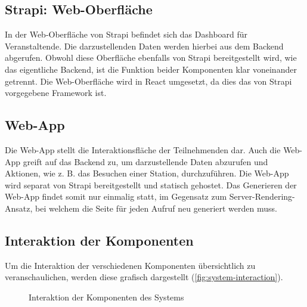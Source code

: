 \subsection{Strapi: Web-Oberfläche}

In der Web-Oberfläche von Strapi befindet sich das Dashboard für Veranstaltende.
Die darzustellenden Daten werden hierbei aus dem Backend abgerufen. Obwohl diese
Oberfläche ebenfalls von Strapi bereitgestellt wird, wie das eigentliche
Backend, ist die Funktion beider Komponenten klar voneinander getrennt. Die
Web-Oberfläche wird in React umgesetzt, da dies das von Strapi vorgegebene
Framework ist.

\subsection{Web-App}

Die Web-App stellt die Interaktionsfläche der Teilnehmenden dar. Auch die
Web-App greift auf das Backend zu, um darzustellende Daten abzurufen und
Aktionen, wie z. B. das Besuchen einer Station, durchzuführen. Die Web-App wird
separat von Strapi bereitgestellt und statisch gehostet. Das Generieren der
Web-App findet somit nur einmalig statt, im Gegensatz zum
Server-Rendering-Ansatz, bei welchem die Seite für jeden Aufruf neu generiert
werden muss.

\subsection{Interaktion der Komponenten}

Um die Interaktion der verschiedenen Komponenten übersichtlich zu
veranschaulichen, werden diese grafisch dargestellt (\autoref{fig:system-interaction}).

\begin{figure}[htpb]
    \renewcommand\baselinestretch{1}
    \centering
    \caption{Interaktion der Komponenten des Systems}
    \label{fig:system-interaction}
\end{figure}


